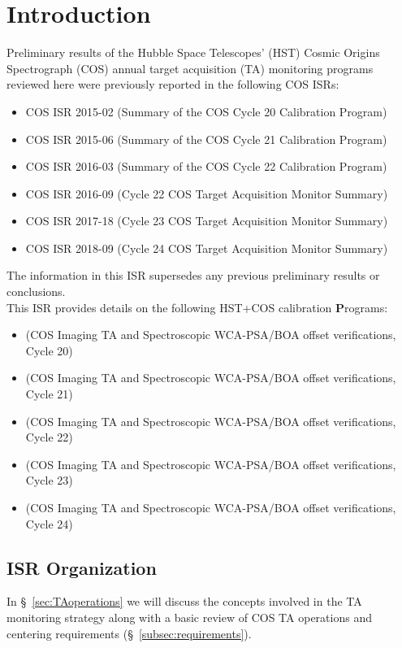 \section{Introduction}\label{sec:Introduction}
Preliminary results of the Hubble Space Telescopes' (HST) Cosmic Origins Spectrograph (COS)
annual target acquisition (TA) monitoring programs reviewed here were previously reported in the following COS ISRs:
\begingroup
\small
\begin{itemize}
\setlength\itemsep{0.1em}
\item{COS ISR 2015-02 (Summary of the COS Cycle 20 Calibration Program)}
\item{COS ISR 2015-06 (Summary of the COS Cycle 21 Calibration Program)}
\item{COS ISR 2016-03 (Summary of the COS Cycle 22 Calibration Program)}
\item{COS ISR 2016-09 (Cycle 22 COS Target Acquisition Monitor Summary)}
\item{COS ISR 2017-18 (Cycle 23 COS Target Acquisition Monitor Summary)}
\item{COS ISR 2018-09 (Cycle 24 COS Target Acquisition Monitor Summary)}
\end{itemize}
\normalsize
\endgroup
\noindent The information in this ISR supersedes any previous preliminary results or conclusions.\\

This ISR provides details on the following HST+COS calibration {\bf P}rograms:
\small
\begin{itemize}
\setlength\itemsep{0.1em}
\item{ (COS Imaging TA and Spectroscopic WCA-PSA/BOA offset verifications, Cycle 20)}
\item{ (COS Imaging TA and Spectroscopic WCA-PSA/BOA offset verifications, Cycle 21)}
\item{ (COS Imaging TA and Spectroscopic WCA-PSA/BOA offset verifications, Cycle 22)}
\item{ (COS Imaging TA and Spectroscopic WCA-PSA/BOA offset verifications, Cycle 23)}
\item{ (COS Imaging TA and Spectroscopic WCA-PSA/BOA offset verifications, Cycle 24)}
\end{itemize}
\normalsize
\clearpage


\subsection{ISR Organization}\label{subsec:org}
In \S~\ref{sec:TAoperations} we will discuss the concepts involved
in the TA monitoring strategy along with a basic review of COS TA operations and
centering requirements (\S~\ref{subsec:requirements}).

